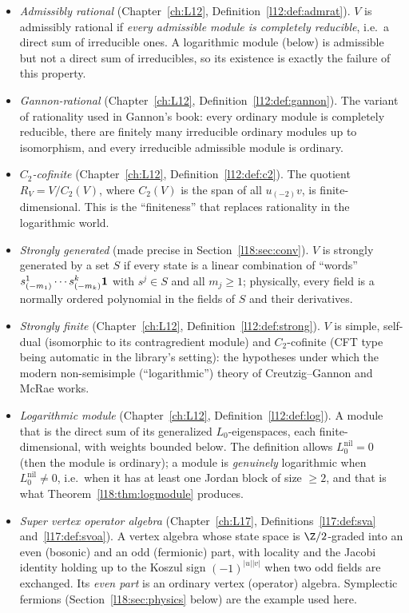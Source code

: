 \begin{itemize}
\item \emph{Admissibly rational} (Chapter~\ref{ch:L12}, Definition~\ref{l12:def:admrat}). $V$ is
  admissibly rational if \emph{every admissible module is completely reducible}, i.e.\ a direct sum of
  irreducible ones. A logarithmic module (below) is admissible but not a direct sum of irreducibles,
  so its existence is exactly the failure of this property.
\item \emph{Gannon-rational} (Chapter~\ref{ch:L12}, Definition~\ref{l12:def:gannon}). The variant of
  rationality used in Gannon's book: every ordinary module is completely reducible, there are finitely
  many irreducible ordinary modules up to isomorphism, and every irreducible admissible module is
  ordinary.
\item \emph{$C_2$-cofinite} (Chapter~\ref{ch:L12}, Definition~\ref{l12:def:c2}). The quotient
  $R_V=V/C_2(V)$, where $C_2(V)$ is the span of all $u_{(-2)}v$, is finite-dimensional. This is the
  ``finiteness'' that replaces rationality in the logarithmic world.
\item \emph{Strongly generated} (made precise in Section~\ref{l18:sec:conv}). $V$ is strongly
  generated by a set $S$ if every state is a linear combination of ``words''
  $s^1_{(-m_1)}\cdots s^k_{(-m_k)}\mathbf{1}$ with $s^j\in S$ and all $m_j\ge1$; physically, every
  field is a normally ordered polynomial in the fields of $S$ and their derivatives.
\item \emph{Strongly finite} (Chapter~\ref{ch:L12}, Definition~\ref{l12:def:strong}). $V$ is simple,
  self-dual (isomorphic to its contragredient module) and $C_2$-cofinite (CFT type being automatic in
  the library's setting): the hypotheses under which the
  modern non-semisimple (``logarithmic'') theory of Creutzig--Gannon and McRae works.
\item \emph{Logarithmic module} (Chapter~\ref{ch:L12}, Definition~\ref{l12:def:log}). A module that
  is the direct sum of its generalized $L_0$-eigenspaces, each finite-dimensional, with weights bounded
  below. The definition allows $L_0^{\mathrm{nil}}=0$ (then the module is ordinary); a module is
  \emph{genuinely} logarithmic when $L_0^{\mathrm{nil}}\neq0$, i.e.\ when it has at least one Jordan
  block of size $\ge2$, and that is what Theorem~\ref{l18:thm:logmodule} produces.
\item \emph{Super vertex operator algebra} (Chapter~\ref{ch:L17}, Definitions~\ref{l17:def:sva}
  and~\ref{l17:def:svoa}). A vertex algebra whose state space is $\Z/2$-graded into an even (bosonic)
  and an odd (fermionic) part, with locality and the Jacobi identity holding up to the Koszul sign
  $(-1)^{|u||v|}$ when two odd fields are exchanged. Its \emph{even part} is an ordinary vertex
  (operator) algebra. Symplectic fermions (Section~\ref{l18:sec:physics} below) are the example used
  here.
\end{itemize}

